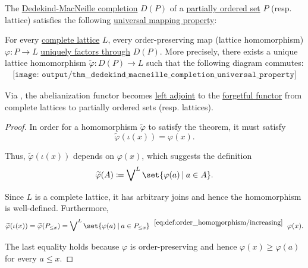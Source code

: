 \begin{theorem}\label{thm:dedekind_macneille_completion_universal_property}
  The \hyperref[def:dedekind_macnielle_completion]{Dedekind-MacNeille completion} \( D(P) \) of a \hyperref[def:partially_ordered_set]{partially ordered set} \( P \) (resp. lattice) satisfies the following \hyperref[rem:universal_mapping_property]{universal mapping property}:
  \begin{displayquote}
    For every \hyperref[def:semilattice/lattice]{complete lattice} \( L \), every order-preserving map (lattice homomorphism) \( \varphi: P \to L \) \hyperref[def:factors_through]{uniquely factors through} \( D(P) \). More precisely, there exists a unique lattice homomorphism \( \widetilde{\varphi}: D(P) \to L \) such that the following diagram commutes:
    \begin{equation}\label{eq:thm:dedekind_macneille_completion_universal_property/diagram}
      \begin{aligned}
        \texttt{[image: output/thm\_\_dedekind\_macneille\_completion\_universal\_property]}
      \end{aligned}
    \end{equation}
  \end{displayquote}

  Via , the abelianization functor becomes \hyperref[def:category_adjunction]{left adjoint} to the \hyperref[def:concrete_category]{forgetful functor} from complete lattices to partially ordered sets (resp. lattices).
\end{theorem}
\begin{proof}
  In order for a homomorphism \( \widetilde{\varphi} \) to satisfy the theorem, it must satisfy
  \begin{equation*}
    \widetilde{\varphi}(\iota(x)) = \varphi(x).
  \end{equation*}

  Thus, \( \widetilde{\varphi}(\iota(x)) \) depends on \( \varphi(x) \), which suggests the definition
  \begin{equation*}
    \widetilde{\varphi}(A) \coloneqq \bigvee\nolimits^L \set{ \varphi(a) \given a \in A }.
  \end{equation*}

  Since \( L \) is a complete lattice, it has arbitrary joins and hence the homomorphism is well-defined. Furthermore,
  \begin{equation*}
    \widetilde{\varphi}(\iota(x))
    =
    \widetilde{\varphi}(P_{\leq x})
    =
    \bigvee\nolimits^L \set{ \varphi(a) \given a \in P_{\leq x} }
    \reloset {\eqref{eq:def:order_homomorphism/increasing}} =
    \varphi(x).
  \end{equation*}

  The last equality holds because \( \varphi \) is order-preserving and hence \( \varphi(x) \geq \varphi(a) \) for every \( a \leq x \).
\end{proof}
